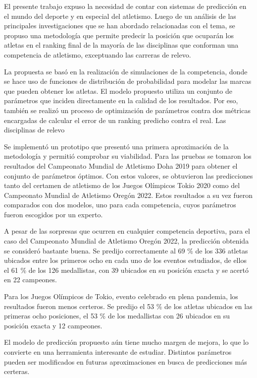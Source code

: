 \begin{conclusions}

El presente trabajo expuso la necesidad de contar con sistemas de predicción en el mundo del deporte y en especial del atletismo. Luego de un análisis de las principales investigaciones que se han abordado relacionadas con el tema, se propuso una metodología que permite predecir la posición que ocuparán los atletas en el ranking final de la mayoría de las disciplinas que conforman una competencia de atletismo, exceptuando las carreras de relevo. 

La propuesta se basó en la realización de simulaciones de la competencia, donde se hace uso de funciones de distribución de probabilidad para modelar las marcas que pueden obtener los atletas. El modelo propuesto utiliza un conjunto de parámetros que inciden directamente en la calidad de los resultados. Por eso, también se realizó un proceso de optimización de parámetros contra dos métricas encargadas de calcular el error de un ranking predicho contra el real. Las disciplinas de relevo  

Se implementó un prototipo que presentó una primera aproximación de la metodología y permitió comprobar su viabilidad. Para las pruebas se tomaron los resultados del Campeonato Mundial de Atletismo Doha 2019 para obtener el conjunto de parámetros óptimos. Con estos valores, se obtuvieron las predicciones tanto del certamen de atletismo de los Juegos Olímpicos Tokio 2020 como del Campeonato Mundial de Atletismo Oregón 2022. Estos resultados a su vez fueron comparados con dos modelos, uno para cada competencia, cuyos parámetros fueron escogidos por un experto.

A pesar de las sorpresas que ocurren en cualquier competencia deportiva, para el caso del Campeonato Mundial de Atletismo Oregón 2022, la predicción obtenida se consideró bastante buena. Se predijo correctamente al 69 \% de los 336 atletas ubicados entre los primeros ocho en cada uno de los eventos estudiados, de ellos el 61 \% de los 126 medallistas, con 39 ubicados en su posición exacta y se acertó en 22 campeones. 

Para los Juegos Olímpicos de Tokio, evento celebrado en plena pandemia, los resultados fueron menos certeros. Se predijo el 53 \% de los atletas ubicados en las primeras ocho posiciones, el 53 \% de los medallistas con 26 ubicados en su posición exacta y 12 campeones.

El modelo de predicción propuesto aún tiene mucho margen de mejora, lo que lo convierte en una herramienta interesante de estudiar. Distintos parámetros pueden ser modificados en futuras aproximaciones en busca de predicciones más certeras.

\end{conclusions}
